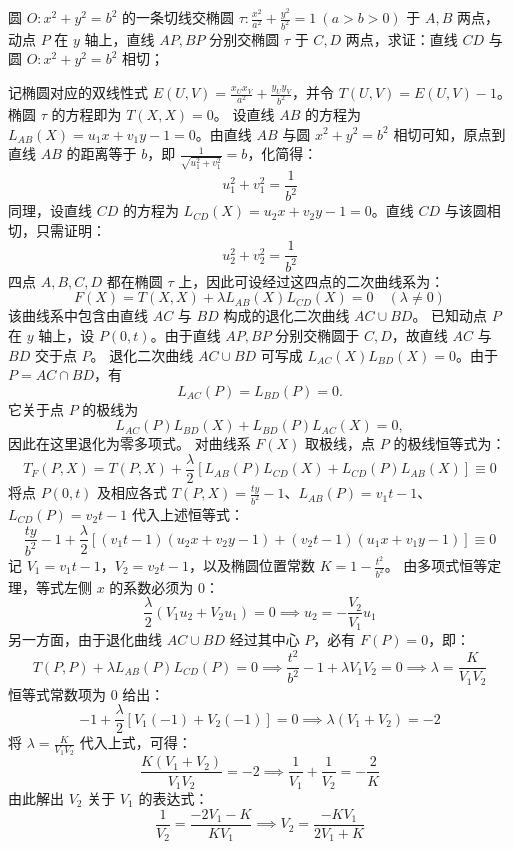 \begin{example}
圆 $O: x^2 + y^2 = b^2$ 的一条切线交椭圆 $\tau: \frac{x^2}{a^2} + \frac{y^2}{b^2} = 1\ (a > b > 0)$ 于 $A,B$ 两点，动点 $P$ 在 $y$ 轴上，直线 $AP,BP$ 分别交椭圆 $\tau$ 于 $C,D$ 两点，求证：直线 $CD$ 与圆 $O: x^2 + y^2 = b^2$ 相切；
\end{example}
\begin{solution}
记椭圆对应的双线性式 $E(U,V) = \frac{x_U x_V}{a^2} + \frac{y_U y_V}{b^2}$，并令 $T(U,V) = E(U,V) - 1$。
椭圆 $\tau$ 的方程即为 $T(X,X) = 0$。
设直线 $AB$ 的方程为 $L_{AB}(X) = u_1 x + v_1 y - 1 = 0$。由直线 $AB$ 与圆 $x^2 + y^2 = b^2$ 相切可知，原点到直线 $AB$ 的距离等于 $b$，即 $\frac{1}{\sqrt{u_1^2 + v_1^2}} = b$，化简得：
$$u_1^2 + v_1^2 = \frac{1}{b^2}$$
同理，设直线 $CD$ 的方程为 $L_{CD}(X) = u_2 x + v_2 y - 1 = 0$。直线 $CD$ 与该圆相切，只需证明：
$$u_2^2 + v_2^2 = \frac{1}{b^2}$$
四点 $A,B,C,D$ 都在椭圆 $\tau$ 上，因此可设经过这四点的二次曲线系为：
$$F(X) = T(X,X) + \lambda L_{AB}(X) L_{CD}(X) = 0 \quad (\lambda \neq 0)$$
该曲线系中包含由直线 $AC$ 与 $BD$ 构成的退化二次曲线 $AC \cup BD$。
已知动点 $P$ 在 $y$ 轴上，设 $P(0, t)$。由于直线 $AP, BP$ 分别交椭圆于 $C, D$，故直线 $AC$ 与 $BD$ 交于点 $P$。
退化二次曲线 $AC\cup BD$ 可写成 $L_{AC}(X)L_{BD}(X)=0$。由于 $P=AC\cap BD$，有
\[
L_{AC}(P)=L_{BD}(P)=0.
\]
它关于点 $P$ 的极线为
\[
L_{AC}(P)L_{BD}(X)+L_{BD}(P)L_{AC}(X)=0,
\]
因此在这里退化为零多项式。
对曲线系 $F(X)$ 取极线，点 $P$ 的极线恒等式为：
$$T_F(P,X) = T(P,X) + \frac{\lambda}{2} \left[ L_{AB}(P) L_{CD}(X) + L_{CD}(P) L_{AB}(X) \right] \equiv 0$$
将点 $P(0,t)$ 及相应各式 $T(P,X) = \frac{t y}{b^2} - 1$、$L_{AB}(P) = v_1 t - 1$、$L_{CD}(P) = v_2 t - 1$ 代入上述恒等式：
$$\frac{t y}{b^2} - 1 + \frac{\lambda}{2} \left[ (v_1 t - 1)(u_2 x + v_2 y - 1) + (v_2 t - 1)(u_1 x + v_1 y - 1) \right] \equiv 0$$
记 $V_1 = v_1 t - 1$，$V_2 = v_2 t - 1$，以及椭圆位置常数 $K = 1 - \frac{t^2}{b^2}$。
由多项式恒等定理，等式左侧 $x$ 的系数必须为 $0$：
$$\frac{\lambda}{2} (V_1 u_2 + V_2 u_1) = 0 \implies u_2 = -\frac{V_2}{V_1} u_1$$
另一方面，由于退化曲线 $AC \cup BD$ 经过其中心 $P$，必有 $F(P) = 0$，即：
$$T(P,P) + \lambda L_{AB}(P) L_{CD}(P) = 0 \implies \frac{t^2}{b^2} - 1 + \lambda V_1 V_2 = 0 \implies \lambda = \frac{K}{V_1 V_2}$$
恒等式常数项为 $0$ 给出：
$$-1 + \frac{\lambda}{2} [ V_1(-1) + V_2(-1) ] = 0 \implies \lambda(V_1 + V_2) = -2$$
将 $\lambda = \frac{K}{V_1 V_2}$ 代入上式，可得：
$$\frac{K(V_1 + V_2)}{V_1 V_2} = -2 \implies \frac{1}{V_1} + \frac{1}{V_2} = -\frac{2}{K}$$
由此解出 $V_2$ 关于 $V_1$ 的表达式：
$$\frac{1}{V_2} = \frac{-2V_1 - K}{K V_1} \implies V_2 = \frac{-K V_1}{2V_1 + K}$$

\end{solution}
